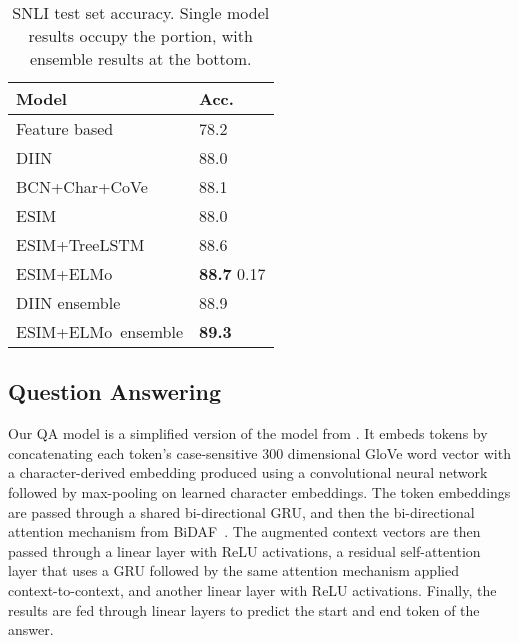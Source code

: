 \documentclass[11pt,a4paper]{article}
\newcommand{\ELMO}{ELMo}
\begin{document}
\begin{table*}
\centering
\begin{tabular}{l|l}
\textbf{Model}                                                 & \textbf{Acc.} \\ \hline \hline
Feature based \citep{snliemnlp2015}                & 78.2                                                    \\
DIIN \citep{Gong2017NaturalLI}                      & 88.0                                                    \\
BCN+Char+CoVe \citep{McCann2017LearnedIT}       & 88.1                                                    \\
ESIM \citep{Chen2017EnhancedLF}                     & 88.0                                                    \\
ESIM+TreeLSTM \citep{Chen2017EnhancedLF} & 88.6                                                    \\
ESIM+\ELMO                                          & \textbf{88.7}  0.17                                           \\ \hline

DIIN ensemble \citep{Gong2017NaturalLI}             & 88.9                                                    \\
ESIM+\ELMO~ensemble                                 & \textbf{89.3}                                          
\end{tabular}
\caption{SNLI test set accuracy.\protect\footnotemark
Single model results occupy the portion, with ensemble results at the bottom.
}
\label{table:snli_test}
\end{table*}



\subsection{Question Answering}
Our QA model is a simplified version of the model from \citet{ClarkAdvancingRC}. It embeds tokens by concatenating each token's case-sensitive 300 dimensional GloVe word vector \citep{Pennington2014GloveGV} with a character-derived embedding produced using a convolutional neural network followed by max-pooling on learned character embeddings. The token embeddings are passed through a shared bi-directional GRU, and then the bi-directional attention mechanism from BiDAF~\cite{Seo2016BidirectionalAF}. The augmented context vectors are then passed through a linear layer with ReLU activations, a residual self-attention layer that uses a GRU followed by the same attention mechanism applied context-to-context, and another linear layer with ReLU activations. Finally, the results are fed through linear layers to predict the start and end token of the answer. 
\end{document}
